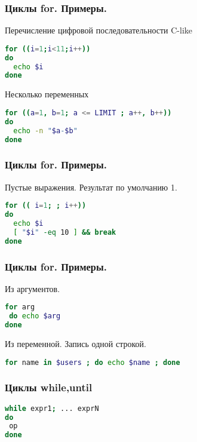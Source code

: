 \begin{frame}[fragile]
\frametitle{ Циклы for. Примеры.}
  \begin{block}{Перечисление цифровой последовательности C-like }
\begin{lstlisting}[language=sh,frame=single]
for ((i=1;i<11;i++))
do 
  echo $i
done  
\end{lstlisting}
  \end{block}

  \begin{block}{Несколько переменных}
    \begin{lstlisting}[language=sh,frame=single]
for ((a=1, b=1; a <= LIMIT ; a++, b++))
do
  echo -n "$a-$b"
done
    \end{lstlisting}
  \end{block}
\end{frame}

\begin{frame}[fragile]
\frametitle{ Циклы for. Примеры.}
  \begin{block}{Пустые выражения. Результат по умолчанию 1. }
    \begin{lstlisting}[language=sh,frame=single]
for (( i=1; ; i++))
do
  echo $i 
  [ "$i" -eq 10 ] && break 
done
    \end{lstlisting}
  \end{block}
\end{frame}

\begin{frame}[fragile]
\frametitle{ Циклы for. Примеры.}
  \begin{block}{Из аргументов.}
    \begin{lstlisting}[language=sh,frame=single]
for arg
 do echo $arg 
done
    \end{lstlisting}
  \end{block}
  \begin{block}{Из переменной. Запись одной строкой.}
    \begin{lstlisting}[language=sh,frame=single]
for name in $users ; do echo $name ; done
    \end{lstlisting}
  \end{block}
\end{frame}

\begin{frame}[fragile]
\frametitle{Циклы while,until}
\begin{lstlisting}[language=sh,frame=single]
while expr1; ... exprN
do
 op
done
\end{lstlisting}
\end{frame}

